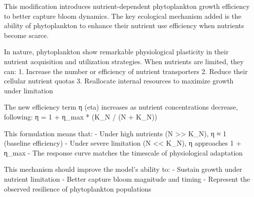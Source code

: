 This modification introduces nutrient-dependent phytoplankton growth efficiency to better capture bloom dynamics. The key ecological mechanism added is the ability of phytoplankton to enhance their nutrient use efficiency when nutrients become scarce.

In nature, phytoplankton show remarkable physiological plasticity in their nutrient acquisition and utilization strategies. When nutrients are limited, they can:
1. Increase the number or efficiency of nutrient transporters
2. Reduce their cellular nutrient quotas
3. Reallocate internal resources to maximize growth under limitation

The new efficiency term η (eta) increases as nutrient concentrations decrease, following:
η = 1 + η_max * (K_N / (N + K_N))

This formulation means that:
- Under high nutrients (N >> K_N), η ≈ 1 (baseline efficiency)
- Under severe limitation (N << K_N), η approaches 1 + η_max
- The response curve matches the timescale of physiological adaptation

This mechanism should improve the model's ability to:
- Sustain growth under nutrient limitation
- Better capture bloom magnitude and timing
- Represent the observed resilience of phytoplankton populations
